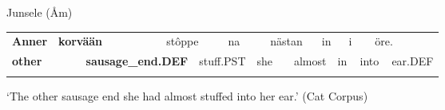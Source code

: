 \begin{listWWNumileveli}
\item 

\begin{styleExample}
Junsele (Åm)

\end{styleExample}

\end{listWWNumileveli}

\begin{tabular}{llllllllllllllll}
\lsptoprule
{\bfseries Anner} & \multicolumn{2}{l}{{\bfseries korvään}

} & \multicolumn{2}{l}{stôppe

} & \multicolumn{2}{l}{na

} & \multicolumn{2}{l}{nästan

} & \multicolumn{2}{l}{in

} & \multicolumn{2}{l}{i

} & \multicolumn{2}{l}{öre.

} & \\
\multicolumn{2}{l}{{\bfseries other}

} & \multicolumn{2}{l}{{\bfseries sausage\_end.DEF}

} & \multicolumn{2}{l}{stuff.PST

} & \multicolumn{2}{l}{she

} & \multicolumn{2}{l}{almost

} & \multicolumn{2}{l}{in

} & \multicolumn{2}{l}{into

} & \multicolumn{2}{l}{ear.DEF

}\\
\lspbottomrule
\end{tabular}

\begin{styleTranslation}
‘The other sausage end she had almost stuffed into her ear.’ (Cat Corpus)

\end{styleTranslation}

